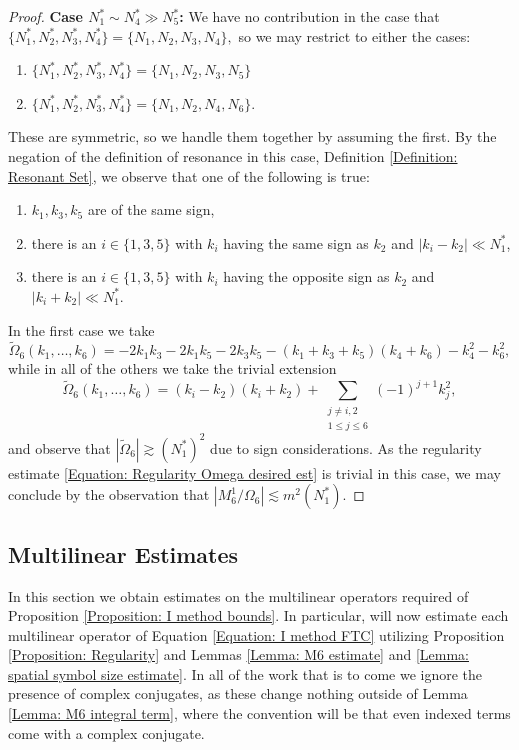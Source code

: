 \documentclass[12pt, letterpaper]{amsart}
\begin{document}
\begin{proof}
    \textbf{Case $N_1^*\sim N_4^*\gg N_5^*$: }We have no contribution in the case that $\{N_1^*, N_2^*, N_3^*, N_4^*\} = \{N_1, N_2, N_3, N_4\},$ so we may restrict to either the cases:
    \begin{enumerate}[label = (\roman*)]
        \item $\{N_1^*, N_2^*, N_3^*, N_4^*\} = \{N_1,N_2,N_3,N_5\}$
        \item $\{N_1^*, N_2^*, N_3^*, N_4^*\} = \{N_1,N_2, N_4, N_6\}$.
    \end{enumerate}
    These are symmetric, so we handle them together by assuming the first. By the negation of the definition of resonance in this case, Definition \ref{Definition: Resonant Set}, we observe that one of the following is true:
    \begin{enumerate}
        \item[i1)] $k_1, k_3, k_5$ are of the same sign,
        \item[i2)] there is an $i\in \{1,3,5\}$ with $k_i$ having the same sign as $k_2$ and $|k_i-k_2|\ll N_1^*$,
        \item[i3)] there is an $i\in\{1,3,5\}$ with $k_i$ having the opposite sign as $k_2$ and $|k_i+k_2|\ll N_1^*$.
    \end{enumerate}
    In the first case we take 
    \[
    \tilde{\Omega}_6(k_1,\dots, k_6) = -2k_1k_3-2k_1k_5-2k_3k_5 - (k_1+k_3+k_5)(k_4+k_6)-k_4^2-k_6^2,
    \]
    while in all of the others we take the trivial extension
    \[
    \tilde{\Omega}_6(k_1,\dots, k_6) = (k_i-k_2)(k_i+k_2) + \sum_{\substack{j\ne i,2\\1\leq j\leq 6}}(-1)^{j+1}k_j^2,
    \]
    and observe that $|\tilde{\Omega}_6|\gtrsim (N_1^*)^2$ due to sign considerations. As the regularity estimate \eqref{Equation: Regularity Omega desired est} is trivial in this case, we may conclude by the observation that $|M^1_6/\Omega_6|\lesssim m^2(N_1^*)$.
\end{proof}
\subsection{Multilinear Estimates}\label{Section: I-method multilinear estimates}
In this section we obtain estimates on the multilinear operators required of Proposition \ref{Proposition: I method bounds}. In particular, will now estimate each multilinear operator of Equation \ref{Equation: I method FTC} utilizing Proposition \ref{Proposition: Regularity} and Lemmas \ref{Lemma: M6 estimate} and \ref{Lemma: spatial symbol size estimate}. In all of the work that is to come we ignore the presence of complex conjugates, as these change nothing outside of Lemma \ref{Lemma: M6 integral term}, where the convention will be that even indexed terms come with a complex conjugate.
\end{document}
